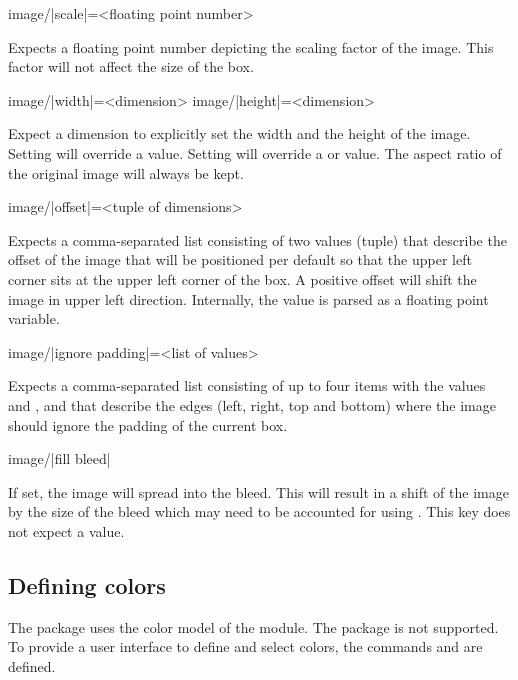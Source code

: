 \documentclass[a4paper]{article}
\begin{document}
\begin{macrodef}
image/|scale|={<floating point number>}
\end{macrodef}
Expects a floating point number depicting the scaling factor of the image. This factor will not affect the size of the box.

\begin{macrodef}
image/|width|={<dimension>}
image/|height|={<dimension>}
\end{macrodef}
Expect a dimension to explicitly set the width and the height of the image. Setting  will override a  value. Setting  will override a  or  value. The aspect ratio of the original image will always be kept.

\begin{macrodef}
image/|offset|={<tuple of dimensions>}
\end{macrodef}
Expects a comma-separated list consisting of two values (tuple) that describe the offset of the image that will be positioned per default so that the upper left corner sits at the upper left corner of the box. A positive offset will shift the image in upper left direction. Internally, the value is parsed as a floating point variable.

\begin{macrodef}
image/|ignore padding|={<list of values>}
\end{macrodef}
Expects a comma-separated list consisting of up to four items with the values  and ,  and  that describe the edges (left, right, top and bottom) where the image should ignore the padding of the current box.

\begin{macrodef}
image/|fill bleed|
\end{macrodef}
If set, the image will spread into the bleed. This will result in a shift of the image by the size of the bleed which may need to be accounted for using . This key does not expect a value.

\subsection{Defining colors}

The package uses the color model of the  module. The  package is not supported. To provide a user interface to define and select colors, the commands \macro{\leporellocolordefine} and \macro{\leporellocolorselect} are defined.
\end{document}
